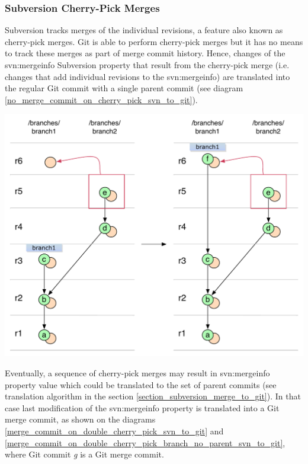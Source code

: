 \subsubsection{Subversion Cherry-Pick Merges}

Subversion tracks merges of the individual revisions, a feature also known as cherry-pick merges. 
Git is able to perform cherry-pick merges but it has no means to track these merges as part of merge commit history. 
Hence, changes of the svn:mergeinfo Subversion property that result from the cherry-pick merge (i.e. changes that add individual revisions to the svn:mergeinfo) are
translated into the regular Git commit with a single parent commit (see diagram \ref{no_merge_commit_on_cherry_pick_svn_to_git}).
\begin{center}
\includegraphics[width=\textwidth]{img/diagrams/no_merge_commit_on_cherry_pick_svn_to_git.pdf}%
\label{no_merge_commit_on_cherry_pick_svn_to_git}%
\end{center}

Eventually, a sequence of cherry-pick merges may result in svn:mergeinfo property value which could 
be translated to the set of parent commits (see translation algorithm in the section \ref{section_subversion_merge_to_git}).
In that case last modification of the svn:mergeinfo property is translated into a Git merge commit, as 
shown on the diagrams \ref{merge_commit_on_double_cherry_pick_svn_to_git} and \ref{merge_commit_on_double_cherry_pick_branch_no_parent_svn_to_git},
where Git commit \emph{g} is a Git merge commit.

